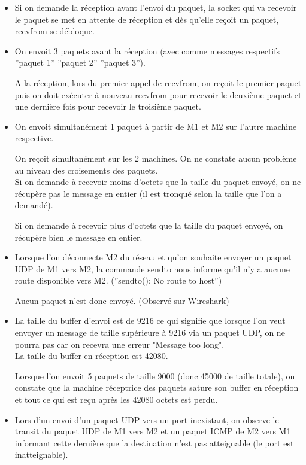 \documentclass{article}
\begin{document}
\begin{itemize}
	\item Si on demande la réception avant l'envoi du paquet, la socket qui va recevoir le paquet se met en attente de réception et dès qu'elle reçoit un paquet, recvfrom se débloque.
	\item On envoit 3 paquets avant la réception (avec comme messages respectifs ''paquet 1'' ''paquet 2'' ''paquet 3'').

A la réception, lors du premier appel de recvfrom, on reçoit le premier paquet puis on doit exécuter à nouveau recvfrom pour recevoir le deuxième paquet et une dernière fois pour recevoir le troisième paquet.

	\item On envoit simultanément 1 paquet à partir de M1 et M2 sur l'autre machine respective.
	
On reçoit simultanément sur les 2 machines. On ne constate aucun problème au niveau des croisements des paquets.\\

Si on demande à recevoir moins d'octets que la taille du paquet envoyé, on ne récupère pas le message en entier (il est tronqué selon la taille que l'on a demandé).

Si on demande à recevoir plus d'octets que la taille du paquet envoyé, on récupère bien le message en entier.

	\item Lorsque l'on déconnecte M2 du réseau et qu'on souhaite envoyer un paquet UDP de M1 vers M2, la commande sendto nous informe qu'il n'y a aucune route disponible vers M2. (''sendto(): No route to host'')

Aucun paquet n'est donc envoyé. (Observé sur Wireshark)

	\item La taille du buffer d'envoi est de 9216 ce qui signifie que lorsque l'on veut envoyer un message de taille supérieure à 9216 via un paquet UDP, on ne pourra pas car on recevra une erreur "Message too long".\\

La taille du buffer en réception est 42080. 

Lorsque l'on envoit 5 paquets de taille 9000 (donc 45000 de taille totale), on constate que la machine réceptrice des paquets sature son buffer en réception et tout ce qui est reçu après les 42080 octets est perdu.

	\item Lors d'un envoi d'un paquet UDP vers un port inexistant, on observe le transit du paquet UDP de M1 vers M2 et un paquet ICMP de M2 vers M1 informant cette dernière que la destination n'est pas atteignable (le port est inatteignable).

\end{itemize}
\end{document}
